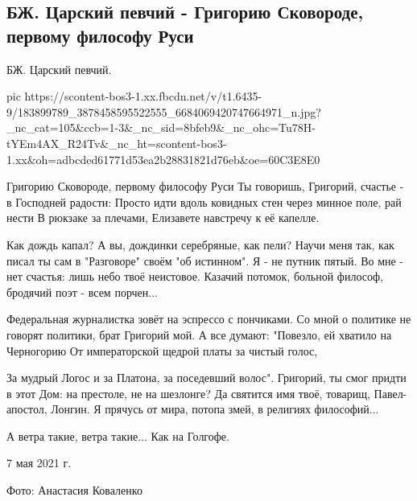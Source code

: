  
 
 
 
 

\subsection{БЖ. Царский певчий - Григорию Сковороде, первому философу Руси}
\label{sec:10_05_2021.fb.bilchenko_evgenia.1.skovoroda_grigorij_filosof}

БЖ. Царский певчий.


\ifcmt
  pic https://scontent-bos3-1.xx.fbcdn.net/v/t1.6435-9/183899789_3878458595522555_6684069420747664971_n.jpg?_nc_cat=105&ccb=1-3&_nc_sid=8bfeb9&_nc_ohc=Tu78H-tYEm4AX_R24Tv&_nc_ht=scontent-bos3-1.xx&oh=adbcded61771d53ea2b28831821d76eb&oe=60C3E8E0
\fi


Григорию Сковороде, первому философу Руси
Ты говоришь, Григорий, счастье - в Господней радости:
Просто идти вдоль ковидных стен через минное поле, рай нести
В рюкзаке за плечами, Елизавете навстречу к её капелле.

Как дождь капал? А вы, дождинки серебряные, как пели?
Научи меня так, как писал ты сам в "Разговоре" своём "об истинном".
Я - не путник пятый. Во мне - нет счастья: лишь небо твоё неистовое.
Казачий потомок, больной философ, бродячий поэт - всем порчен...

Федеральная журналистка зовёт на эспрессо с пончиками.
Со мной о политике не говорят политики, брат Григорий мой.
А все думают: "Повезло, ей хватило на Черногорию
От императорской щедрой платы за чистый голос,

За мудрый Логос и за Платона, за поседевший волос".
Григорий, ты смог придти в этот Дом: на престоле, не на шезлонге?
Да святится имя твоё, товарищ, Павел-апостол, Лонгин.
Я прячусь от мира, потопа змей, в религиях философий...

А ветра такие, ветра такие...
Как на Голгофе.

7 мая 2021 г.

Фото: Анастасия Коваленко
